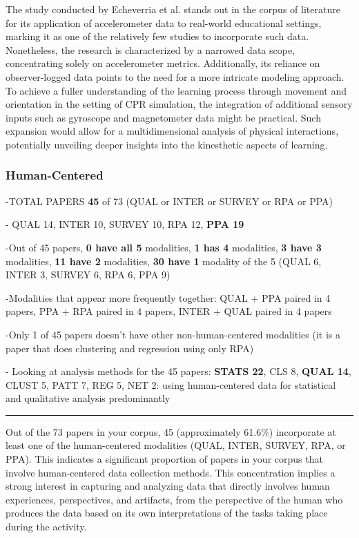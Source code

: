 \documentclass[manuscript,screen,review]{acmart}
\begin{document}
The study conducted by Echeverria et al. \cite{1296637108} stands out in the corpus of literature for its application of accelerometer data to real-world educational settings, marking it as one of the relatively few studies to incorporate such data. Nonetheless, the research is characterized by a narrowed data scope, concentrating solely on accelerometer metrics. Additionally, its reliance on observer-logged data points to the need for a more intricate modeling approach. To achieve a fuller understanding of the learning process through movement and orientation in the setting of CPR simulation, the integration of additional sensory inputs such as gyroscope and magnetometer data might be practical. Such expansion would allow for a multidimensional analysis of physical interactions, potentially unveiling deeper insights into the kinesthetic aspects of learning.

\subsubsection{Human-Centered}

-TOTAL PAPERS\textbf{ 45} of 73 (QUAL or INTER or SURVEY or RPA or PPA)


- QUAL 14, INTER 10, SURVEY 10, RPA 12, \textbf{PPA 19}

-Out of 45 papers, \textbf{0 have all 5} modalities, \textbf{1 has 4} modalities, \textbf{3 have 3} modalities, \textbf{11 have 2} modalities, \textbf{30 have 1} modality of the 5 (QUAL 6, INTER 3, SURVEY 6, RPA 6, PPA 9)

-Modalities that appear more frequently together: QUAL + PPA paired in 4 papers, PPA + RPA paired in 4 papers, INTER + QUAL paired in 4 papers

-Only 1 of 45 papers doesn't have other non-human-centered modalities (it is a paper that does clustering and regression using only RPA)

- Looking at analysis methods for the 45 papers: \textbf{STATS 22}, CLS 8, \textbf{QUAL 14}, CLUST 5, PATT 7, REG 5, NET 2: using human-centered data for statistical and qualitative analysis predominantly

\noindent\rule{2cm}{0.4pt}

Out of the 73 papers in your corpus, 45 (approximately 61.6\%) incorporate at least one of the human-centered modalities (QUAL, INTER, SURVEY, RPA, or PPA). This indicates a significant proportion of papers in your corpus that involve human-centered data collection methods. This concentration implies a strong interest in capturing and analyzing data that directly involves human experiences, perspectives, and artifacts, from the perspective of the human who produces the data based on its own interpretations of the tasks taking place during the activity.
\end{document}
